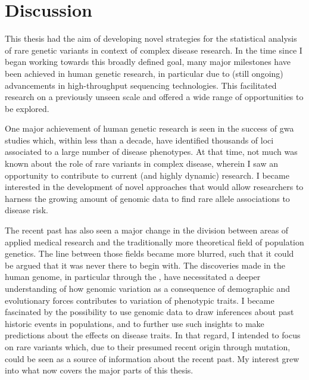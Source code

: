 
\glsresetall




{
\singlespacing
\chapter{Discussion}
\label{ch:discussion}
\minitoc
}


This thesis had the aim of developing novel strategies for the statistical analysis of rare genetic variants in context of complex disease research.
In the time since I began working towards this broadly defined goal, many major milestones have been achieved in human genetic research, in particular due to (still ongoing) advancements in high-throughput sequencing technologies.
This facilitated research on a previously unseen scale and offered a wide range of opportunities to be explored.

One major achievement of human genetic research is seen in the success of \gls{gwa} studies which, within less than a decade, have identified thousands of loci associated to a large number of disease phenotypes.
At that time, not much was known about the role of rare variants in complex disease, wherein I saw an opportunity to contribute to current (and highly dynamic) research.
I became interested in the development of novel approaches that would allow researchers to harness the growing amount of genomic data to find rare allele associations to disease risk.

The recent past has also seen a major change in the division between areas of applied medical research and the traditionally more theoretical field of population genetics.
The line between those fields became more blurred, such that it could be argued that it was never there to begin with.
The discoveries made in the human genome, in particular through the  \citep{IntHumGenSeqCon:2001hk,IntHumGenSeqCon:2004bm}, have necessitated a deeper understanding of how genomic variation as a consequence of demographic and evolutionary forces contributes to variation of phenotypic traits.
I became fascinated by the possibility to use genomic data to draw inferences about past historic events in populations, and to further use such insights to make predictions about the effects on disease traits.
In that regard, I intended to focus on rare variants which, due to their presumed recent origin through mutation, could be seen as a source of information about the recent past.
My interest grew into what now covers the major parts of this thesis.






